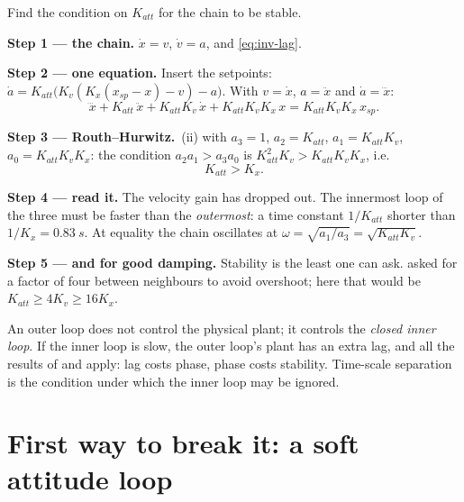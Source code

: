 \begin{example}
\label{ex:inv-cubic}
Find the condition on $K_{att}$ for the chain to be stable.

\textbf{Step 1 — the chain.} $\dot x = v$, $\dot v = a$, and \cref{eq:inv-lag}.

\textbf{Step 2 — one equation.} Insert the setpoints: $\dot a = K_{att}\big(K_v(K_x(x_{sp} - x) - v) - a\big)$. With $v = \dot x$, $a = \ddot x$ and $\dot a = \dddot x$:
\begin{equation}\label{eq:inv-cubic}
  \dddot x + K_{att}\,\ddot x + K_{att}K_v\,\dot x + K_{att}K_vK_x\,x = K_{att}K_vK_x\,x_{sp} .
\end{equation}

\textbf{Step 3 — Routh–Hurwitz.} \,(ii) with $a_3 = 1$, $a_2 = K_{att}$, $a_1 = K_{att}K_v$, $a_0 = K_{att}K_vK_x$: the condition $a_2a_1 > a_3a_0$ is $K_{att}^2K_v > K_{att}K_vK_x$, i.e.
\begin{equation}\label{eq:inv-rule}
  K_{att} > K_x .
\end{equation}

\textbf{Step 4 — read it.} The velocity gain has dropped out. The innermost loop of the three must be faster than the \emph{outermost}: a time constant $1/K_{att}$ shorter than $1/K_x = \SI{0.83}{s}$. At equality the chain oscillates at $\omega = \sqrt{a_1/a_3} = \sqrt{K_{att}K_v}$.

\textbf{Step 5 — and for good damping.} Stability is the least one can ask.  asked for a factor of four between neighbours to avoid overshoot; here that would be $K_{att} \ge 4K_v \ge 16K_x$.
\end{example}

\begin{keyidea}
An outer loop does not control the physical plant; it controls the \emph{closed inner loop}. If the inner loop is slow, the outer loop's plant has an extra lag, and all the results of  and  apply: lag costs phase, phase costs stability. Time-scale separation is the condition under which the inner loop may be ignored.
\end{keyidea}

\section{First way to break it: a soft attitude loop}

